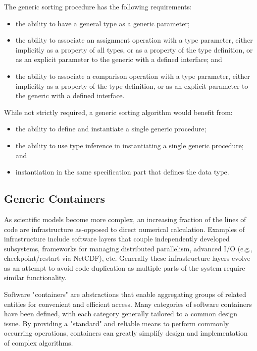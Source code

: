 \documentclass{article}
\newcounter{requirement}
\begin{document}
The generic sorting procedure has the following requirements:
\begin{itemize}
\item the ability to have a general type as a generic parameter;

\item the ability to associate an assignment operation with a type
  parameter, either implicitly as a property of all  types, or
  as a property of the type definition, or as an explicit parameter to
  the generic with a defined interface; and

\item the ability to associate a comparison operation with a type
  parameter, either implicitly
  as a property of the type definition, or as an explicit parameter to
  the generic with a defined interface.

\end{itemize}
While not strictly required, a generic sorting algorithm would benefit
from:
\begin{itemize}
\item the ability to define and instantiate a single generic procedure;

\item the ability to use type inference in instantiating a single generic
  procedure; and

\item instantiation in the same specification part that defines the data
  type.
\end{itemize}


\subsection{Generic Containers}

 As scientific models become more complex, an increasing fraction of
   the lines of code are infrastructure as-opposed to direct
   numerical calculation.  Examples of infrastructure include software
   layers that couple independently developed subsystems, frameworks
   for managing distributed parallelism, advanced I/O (e.g.,
   checkpoint/restart via NetCDF), etc.  Generally these
   infrastructure layers evolve as an attempt to avoid code
   duplication as multiple parts of the system require similar
   functionality.

 Software "containers" are abstractions that enable aggregating groups of related entities for convenient and efficient access.   Many categories of software containers have been defined, with each   category generally tailored to a common design issue.  By providing a   "standard" and reliable means to perform commonly occurring   operations, containers can greatly simplify design and   implementation of complex algorithms.
\end{document}
